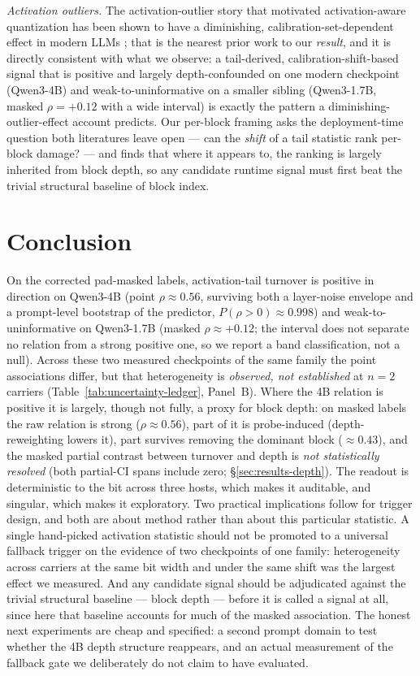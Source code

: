 \documentclass{article}
\begin{document}
\emph{Activation outliers.} The activation-outlier story that motivated activation-aware
quantization has been shown to have a diminishing, calibration-set-dependent effect in modern LLMs
\citep{paglieri2024outliers}; that is the nearest prior work to our \emph{result}, and it is
directly consistent with what we observe: a tail-derived, calibration-shift-based signal that is
positive and largely depth-confounded on one modern checkpoint (Qwen3-4B) and weak-to-uninformative
on a smaller sibling (Qwen3-1.7B, masked $\rho=+0.12$ with a wide interval) is exactly the pattern
a diminishing-outlier-effect account predicts. Our per-block framing asks the deployment-time
question both literatures leave open --- can the \emph{shift} of a tail statistic rank per-block
damage? --- and finds that where it appears to, the ranking is largely inherited from block depth,
so any candidate runtime signal must first beat the trivial structural baseline of block index.

\section{Conclusion}
\label{sec:conclusion}
On the corrected pad-masked labels, activation-tail turnover is positive in direction on Qwen3-4B
(point $\rho\approx 0.56$, surviving both a layer-noise envelope and a prompt-level bootstrap of
the predictor, $P(\rho>0)\approx 0.998$) and weak-to-uninformative on Qwen3-1.7B (masked
$\rho\approx +0.12$; the interval does not separate no relation from a strong positive one, so we
report a band classification, not a null). Across these two measured checkpoints of the same
family the point associations differ, but that heterogeneity is \emph{observed, not established}
at $n{=}2$ carriers (Table~\ref{tab:uncertainty-ledger}, Panel~B). Where the 4B relation is
positive it is largely, though not fully, a proxy for block depth: on masked labels the raw
relation is strong ($\rho\approx 0.56$), part of it is probe-induced (depth-reweighting lowers it),
part survives removing the dominant block ($\approx 0.43$), and the masked partial contrast
between turnover and depth is \emph{not statistically resolved} (both partial-CI spans include
zero; \S\ref{sec:results-depth}). The readout is deterministic to the bit across three hosts,
which makes it auditable, and singular, which makes it exploratory. Two practical implications
follow for trigger design, and both are about method rather than about this particular statistic.
A single hand-picked activation statistic should not be promoted to a universal fallback trigger
on the evidence of two checkpoints of one family: heterogeneity across carriers at the same bit
width and under the same shift was the largest effect we measured. And any candidate signal should
be adjudicated against the trivial structural baseline --- block depth --- before it is called a
signal at all, since here that baseline accounts for much of the masked association. The honest
next experiments are cheap and specified: a second prompt domain to test whether the 4B depth
structure reappears, and an actual measurement of the fallback gate we deliberately do not claim
to have evaluated.
\end{document}
